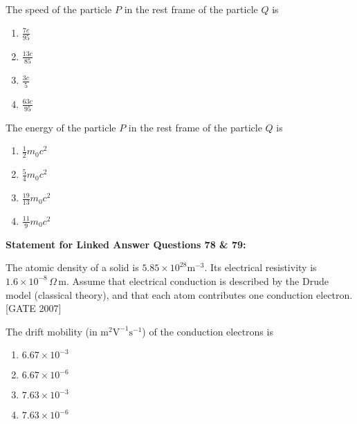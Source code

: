     \item  The speed of the particle $P$ in the rest frame of the particle $Q$ is
    \begin{multicols}{4}
    \begin{enumerate}
        \item $\frac{7c}{95}$
        \item $\frac{13c}{85}$
        \item $\frac{3c}{5}$
        \item $\frac{63c}{95}$
    \end{enumerate}
    \end{multicols}

    \item  The energy of the particle $P$ in the rest frame of the particle $Q$ is
    \begin{multicols}{4}
    \begin{enumerate}
        \item $\frac{1}{2} m_0 c^2$
        \item $\frac{5}{4} m_0 c^2$
        \item $\frac{19}{13} m_0 c^2$
        \item $\frac{11}{9} m_0 c^2$
    \end{enumerate}
    \end{multicols}


\bigskip

\textbf{Statement for Linked Answer Questions 78 \& 79:}

The atomic density of a solid is $5.85 \times 10^{28} \text{m}^{-3}$. Its electrical resistivity is $1.6 \times 10^{-8} \, \Omega \, \text{m}$. Assume that electrical conduction is described by the Drude model (classical theory), and that each atom contributes one conduction electron.  \hfill{[GATE 2007]}


    \item The drift mobility (in $\text{m}^2 \text{V}^{-1} \text{s}^{-1}$) of the conduction electrons is
    \begin{multicols}{4}
    \begin{enumerate}
        \item $6.67 \times 10^{-3}$
        \item $6.67 \times 10^{-6}$
        \item $7.63 \times 10^{-3}$
        \item $7.63 \times 10^{-6}$
    \end{enumerate}
    \end{multicols}

